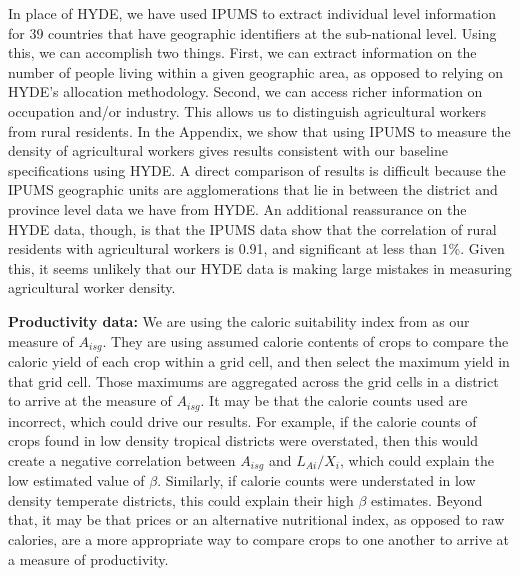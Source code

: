 \documentclass[11pt]{article}
\begin{document}
In place of HYDE, we have used IPUMS \nocite{ipums} to extract individual level information for 39 countries that have geographic identifiers at the sub-national level. Using this, we can accomplish two things. First, we can extract information on the number of people living within a given geographic area, as opposed to relying on HYDE's allocation methodology. Second, we can access richer information on occupation and/or industry. This allows us to distinguish agricultural workers from rural residents. In the Appendix, we show that using IPUMS to measure the density of agricultural workers gives results consistent with our baseline specifications using HYDE. A direct comparison of results is difficult because the IPUMS geographic units are agglomerations that lie in between the district and province level data we have from HYDE. An additional reassurance on the HYDE data, though, is that the IPUMS data show that the correlation of rural residents with agricultural workers is 0.91, and significant at less than 1\%. Given this, it seems unlikely that our HYDE data is making large mistakes in measuring agricultural worker density.

\vspace{.5cm}\noindent\textbf{Productivity data:} We are using the caloric suitability index from \citet{galorozak2016} as our measure of $A_{isg}$. They are using assumed calorie contents of crops to compare the caloric yield of each crop within a grid cell, and then select the maximum yield in that grid cell. Those maximums are aggregated across the grid cells in a district to arrive at the measure of $A_{isg}$. It may be that the calorie counts used are incorrect, which could drive our results. For example, if the calorie counts of crops found in low density tropical districts were overstated, then this would create a negative correlation between $A_{isg}$ and $L_{Ai}/X_i$, which could explain the low estimated value of $\beta$. Similarly, if calorie counts were understated in low density temperate districts, this could explain their high $\beta$ estimates. Beyond that, it may be that prices or an alternative nutritional index, as opposed to raw calories, are a more appropriate way to compare crops to one another to arrive at a measure of productivity. 
\end{document}

